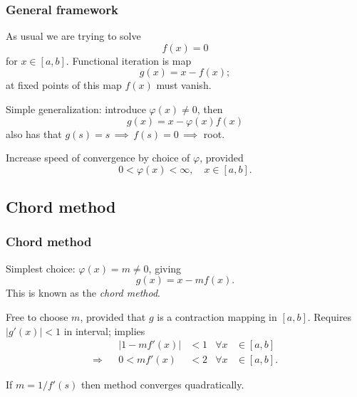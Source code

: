\documentclass{beamer}
\begin{document}
\begin{frame}
  \frametitle{General framework}

  As usual we are trying to solve
  \begin{equation*}
    f(x) = 0
  \end{equation*}
  for $x \in [a,b]$. Functional iteration is map
  \begin{equation*}
    g(x) = x - f(x);
  \end{equation*}
  at fixed points of this map $f(x)$ must vanish. \pause

  \vspace{1ex}

  Simple generalization: introduce $\varphi(x) \neq 0$, then
  \begin{equation*}
    g(x) = x - \varphi(x) f(x)
  \end{equation*}
  also has that $g(s) = s \, \implies \, f(s) = 0 \, \implies$ root. \pause

  \vspace{1ex}

  Increase speed of convergence by choice of $\varphi$, provided
  \begin{equation*}
    0 < \varphi(x) < \infty, \quad x \in [a, b].
  \end{equation*}

\end{frame}


\subsection{Chord method}

\begin{frame}
  \frametitle{Chord method}

  Simplest choice: $\varphi(x) = m \neq 0$, giving
  \begin{equation*}
    g(x) = x - m f(x).
  \end{equation*}
  This is known as the \emph{chord method}. \pause

  \vspace{1ex}

  Free to choose $m$, provided that $g$ is a contraction
  mapping in $[a,b]$. Requires $|g'(x)| < 1$ in interval; implies
  \begin{align*}
    && | 1 - m f'(x) | & < 1 & \forall x & \in [a,b] \\
    \Rightarrow && 0 < m f'(x) & < 2 & \forall x & \in [a,b].
  \end{align*} \pause

  If $m = 1 / f'(s)$ then method converges quadratically.

\end{frame}
\end{document}
